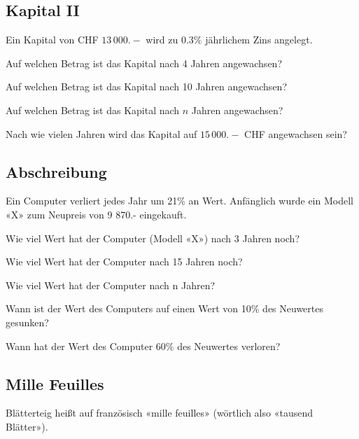 \subsection{Kapital II}
Ein Kapital von CHF $13\,000.-$ wird zu $0.3\%$ jährlichem Zins angelegt.
\begin{bbwAufgabenBlock}
\item Auf welchen Betrag ist das Kapital nach 4 Jahren
angewachsen?  \plz{}
\item Auf welchen Betrag ist das Kapital nach 10 Jahren
angewachsen?  \plz{}
\item Auf welchen Betrag ist das Kapital nach $n$ Jahren
angewachsen?  \plz{} \noTRAINER{\newpage}
\item Nach wie vielen Jahren wird das Kapital auf $15\,000.-$ CHF
angewachsen sein?  \plz{}
\end{bbwAufgabenBlock}
\platzFuerBerechnungenBisEndeSeite{}
\subsection{Abschreibung}
Ein Computer verliert jedes Jahr um 21\% an Wert. Anfänglich wurde ein Modell «X»
zum Neupreis von 9 870.- eingekauft.

\begin{bbwAufgabenBlock}
\item  Wie viel Wert hat der Computer (Modell «X») nach 3 Jahren
noch?  \plz{}
\item Wie viel Wert hat der Computer nach 15 Jahren noch?  \plz{}
\item Wie viel Wert hat der Computer nach n Jahren?  \plz{} \noTRAINER{\newpage}
\item Wann ist der Wert des Computers auf einen Wert von 10\% des
Neuwertes gesunken?  \plz{}
\item Wann hat der Wert des Computer 60\% des Neuwertes
verloren?  \plz{}
\end{bbwAufgabenBlock}

\platzFuerBerechnungenBisEndeSeite{}
\subsection{Mille Feuilles}
Blätterteig heißt auf französisch «mille feuilles» (wörtlich also
«tausend Blätter»).

